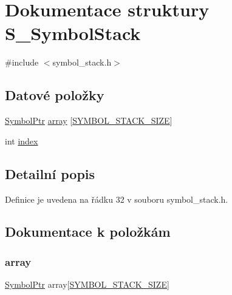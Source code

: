 \hypertarget{struct_s___symbol_stack}{}\section{Dokumentace struktury S\+\_\+\+Symbol\+Stack}
\label{struct_s___symbol_stack}


{\ttfamily \#include $<$symbol\+\_\+stack.\+h$>$}

\subsection*{Datové položky}
\begin{DoxyCompactItemize}
\item 
\hyperlink{symtable_8h_ae75ae77f6060003cdcf7bd31d2c972f2}{Symbol\+Ptr} \hyperlink{struct_s___symbol_stack_ac8fc823b00dafbda1fa77b808ca93985}{array} \mbox{[}\hyperlink{symbol__stack_8h_a4196c855b5b6a9a99f1eb2b72ec9628c}{S\+Y\+M\+B\+O\+L\+\_\+\+S\+T\+A\+C\+K\+\_\+\+S\+I\+ZE}\mbox{]}
\item 
int \hyperlink{struct_s___symbol_stack_a750b5d744c39a06bfb13e6eb010e35d0}{index}
\end{DoxyCompactItemize}


\subsection{Detailní popis}


Definice je uvedena na řádku 32 v souboru symbol\+\_\+stack.\+h.



\subsection{Dokumentace k položkám}
\mbox{\label{struct_s___symbol_stack_ac8fc823b00dafbda1fa77b808ca93985}} 
\subsubsection{\texorpdfstring{array}{array}}
{\footnotesize\ttfamily \hyperlink{symtable_8h_ae75ae77f6060003cdcf7bd31d2c972f2}{Symbol\+Ptr} array\mbox{[}\hyperlink{symbol__stack_8h_a4196c855b5b6a9a99f1eb2b72ec9628c}{S\+Y\+M\+B\+O\+L\+\_\+\+S\+T\+A\+C\+K\+\_\+\+S\+I\+ZE}\mbox{]}}



